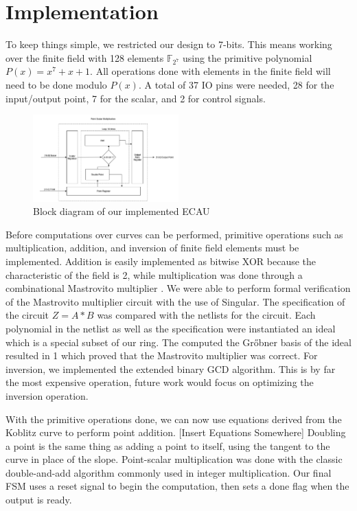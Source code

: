 \documentclass{IEEEtran}
\begin{document}
\section{Implementation}

To keep things simple, we restricted our design to 7-bits. This means working over the finite field with 128 elements $\mathbb{F}_{2^7}$ using the primitive polynomial $P(x) = x^7 + x + 1$. All operations done with elements in the finite field will need to be done modulo $P(x)$. A total of 37 IO pins were needed, 28 for the input/output point, 7 for the scalar, and 2 for control signals. 

\begin{figure}%
\centering
\captionsetup{justification=centering}
\includegraphics[width=0.5\textwidth]{images/blockdiagram.png}
\caption{Block diagram of our implemented ECAU}
\label{block}
\end{figure}

Before computations over curves can be performed, primitive operations such as multiplication, addition, and inversion of finite field elements must be implemented. Addition is easily implemented as bitwise XOR because the characteristic of the field is 2, while multiplication was done through a combinational Mastrovito multiplier \cite{Kallabook}. We were able to perform formal verification of the Mastrovito multiplier circuit with the use of Singular. The specification of the circuit $Z=A*B$ was compared with the netlists for the circuit. Each polynomial in the netlist as well as the specification were instantiated an ideal which is a special subset of our ring. The computed the Gr{\H o}bner basis of the ideal resulted in 1 which proved that the Mastrovito multiplier was correct. For inversion, we implemented the extended binary GCD algorithm. This is by far the most expensive operation, future work would focus on optimizing the inversion operation.

With the primitive operations done, we can now use equations derived from the Koblitz curve to perform point addition. [Insert Equations Somewhere] Doubling a point is the same thing as adding a point to itself, using the tangent to the curve in place of the slope. Point-scalar multiplication was done with the classic double-and-add algorithm commonly used in integer multiplication. Our final FSM uses a reset signal to begin the computation, then sets a done flag when the output is ready. 
\end{document}
